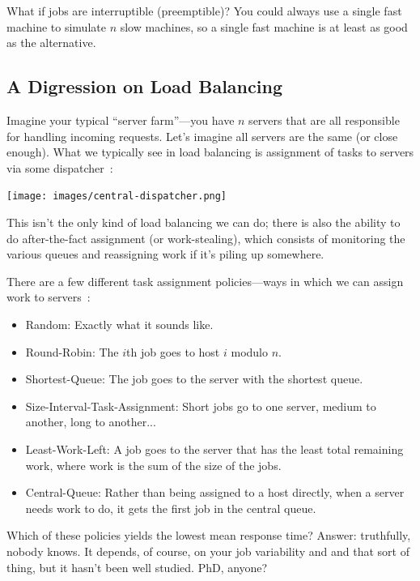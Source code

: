 \documentclass[a4paper]{report}
\begin{document}
What if jobs are interruptible (preemptible)? You could always use a single fast machine to simulate $n$ slow machines, so a single fast machine is at least as good as the alternative. 

\subsection*{A Digression on Load Balancing}

Imagine your typical ``server farm''---you have $n$ servers that are all responsible for handling incoming requests. Let's imagine all servers are the same (or close enough). What we typically see in load balancing is assignment of tasks to servers via some dispatcher~\cite{pmd}:

\begin{center}
	\texttt{[image: images/central-dispatcher.png]}
\end{center}

This isn't the only kind of load balancing we can do; there is also the ability to do after-the-fact assignment (or work-stealing), which consists of monitoring the various queues and reassigning work if it's piling up somewhere.

There are a few different task assignment policies---ways in which we can assign work to servers~\cite{pmd}:

\begin{itemize}
	\item Random: Exactly what it sounds like.
	\item Round-Robin: The $i$th job goes to host $i$ modulo $n$.
	\item Shortest-Queue: The job goes to the server with the shortest queue.
	\item Size-Interval-Task-Assignment: Short jobs go to one server, medium to another, long to another...
	\item Least-Work-Left: A job goes to the server that has the least total remaining work, where work is the sum of the size of the jobs.
	\item Central-Queue: Rather than being assigned to a host directly, when a server needs work to do, it gets the first job in the central queue.
\end{itemize}

Which of these policies yields the lowest mean response time? Answer: truthfully, nobody knows. It depends, of course, on your job variability and and that sort of thing, but it hasn't been well studied. PhD, anyone?
\end{document}
